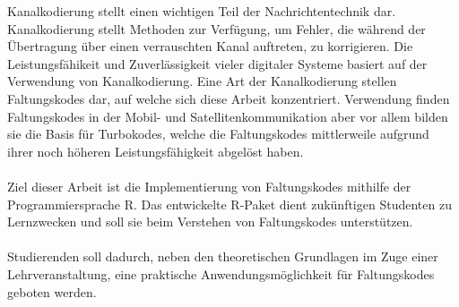 Kanalkodierung stellt einen wichtigen Teil der Nachrichtentechnik dar. Kanalkodierung stellt Methoden zur Verfügung, um Fehler, die während der Übertragung über einen verrauschten Kanal auftreten, zu korrigieren. Die Leistungsfähikeit und Zuverlässigkeit vieler digitaler Systeme basiert auf der Verwendung von Kanalkodierung. Eine Art der Kanalkodierung stellen Faltungskodes dar, auf welche sich diese Arbeit konzentriert. Verwendung finden Faltungskodes in der Mobil- und Satellitenkommunikation aber vor allem bilden sie die Basis für Turbokodes, welche die Faltungskodes mittlerweile aufgrund ihrer noch höheren Leistungsfähigkeit abgelöst haben.
\\
\\
Ziel dieser Arbeit ist die Implementierung von Faltungskodes mithilfe der Programmiersprache R. Das entwickelte R-Paket dient zukünftigen Studenten zu Lernzwecken und soll sie beim Verstehen von Faltungskodes unterstützen.
\\
\\
Studierenden soll dadurch, neben den theoretischen Grundlagen im Zuge einer Lehrveranstaltung, eine praktische Anwendungsmöglichkeit für Faltungskodes geboten werden. 